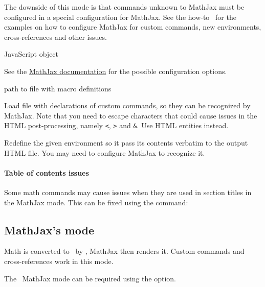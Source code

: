 The downside of this mode is that commands unknown to MathJax must be configured in a special configuration for
MathJax. See the how-to~ for the examples 
on how to configure MathJax for custom commands, new environments, cross-references
and other issues.

 {JavaScript object}\EndDoc

See the \href{https://docs.mathjax.org/en/latest/options/index.html}{MathJax documentation}
for the possible configuration options. 



 {path to file with macro definitions}\EndDoc

Load file with declarations of custom commands, so they can be recognized 
by MathJax. Note that you need to escape characters that could cause issues
in the HTML post-processing, namely \verb|<|, \verb|>| and \verb|&|. Use 
HTML entities instead.


Redefine the given environment so it pass its contents verbatim to the output HTML file.
You may need to configure MathJax to recognize it.


\paragraph{Table of contents issues}

Some math commands may cause issues when they are used in section titles in the MathJax mode. 
This can be fixed using the \texcommand{\fixmathjaxtoc} command:

\begin{texsource}
\fixmathjaxtoc\int
\end{texsource}

\subsection{MathJax's \mathml{} mode}

Math is converted to \mathml\ by \texfourht, MathJax then renders it. Custom
commands and cross-references work in this mode.

The \mathml\ MathJax mode can be required using the  option.


